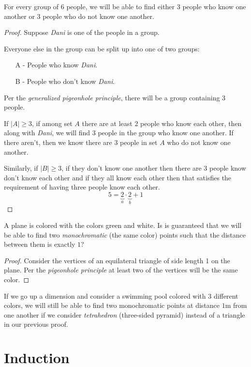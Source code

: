 \documentclass[00_complete]{subfiles}
\begin{document}
\begin{example}
    For every group of 6 people, we will be able to find either 3 people
    who know one another or 3 people who do not know one another.
\end{example}
\begin{proof}
    Suppose \emph{Dani} is one of the people in a group.

    Everyone else in the group can be split up into one of two groups:
    \begin{itemize}
        \item[A -] People who know \emph{Dani}.
        \item[B -] People who don't know \emph{Dani}.
    \end{itemize}
    Per the \emph{generalized pigeonhole principle}, there will be a group
    containing 3 people.

    If $|A|\geq 3$, if among set $A$ there are at least 2 people who know each other, then along
    with \emph{Dani}, we will find 3 people in the group who know one
    another. If there aren't, then we know there are 3 people in set $A$ who do
    not know one another.

    Similarly, if $|B|\geq3$, if they don't know one another then there are 3
    people know don't know each other and if they all know each other then that
    satisfies the requirement of having three people know each other.
    $$5=\underbrace{2}_{a}\cdot\underbrace{2}_{b}+1$$
\end{proof}

\begin{example}
    A plane is colored with the colors green and white. Is is guaranteed that
    we will be able to find two \emph{monochromatic} (the same color) points
    such that the distance between them is exactly $1$?
    \begin{proof}
    Consider the vertices of an equilateral triangle of side length 1 on the
    plane. Per the \emph{pigeonhole principle} at least two of the vertices
    will be the same color.
\end{proof}
    If we go up a dimension and consider a swimming pool colored with 3
    different colors, we will still be able to find two monochromatic points at
    distance $1$m from one another if we consider \emph{tetrahedron}
    (three-sided pyramid) instead of a triangle in our previous proof.
\end{example}

\section{Induction}
\end{document}
